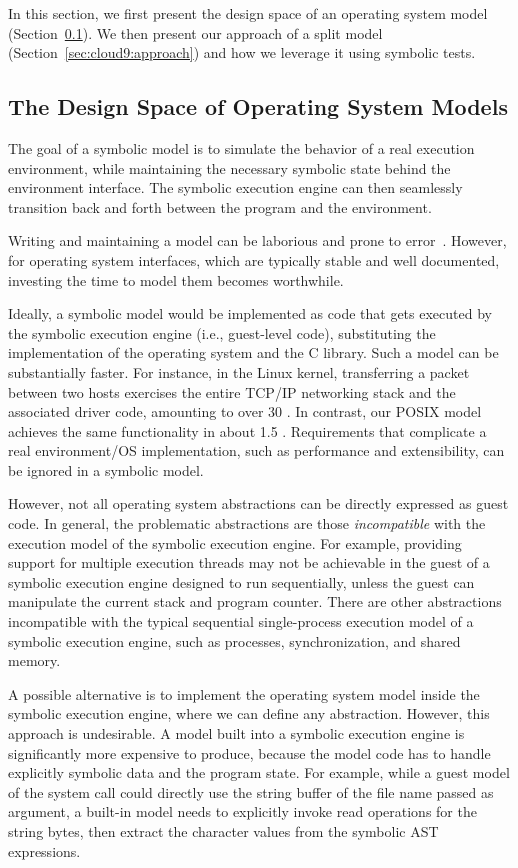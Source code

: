 In this section, we first present the design space of an operating system model (Section~\ref{sec:cloud9:modelspace}).  We then present our approach of a split model (Section~\ref{sec:cloud9:approach}) and how we leverage it using symbolic tests.


\subsection{The Design Space of Operating System Models}
\label{sec:cloud9:modelspace}

The goal of a symbolic model is to simulate the behavior of a real execution environment, while maintaining the necessary symbolic state behind the environment interface.
%
The symbolic execution engine can then seamlessly transition back and forth between the program and the environment.

Writing and maintaining a model can be laborious and prone to error~\cite{s2eSystem}.
%
However, for operating system interfaces, which are typically stable and well documented, investing the time to model them becomes worthwhile.

Ideally, a symbolic model would be implemented as code that gets executed by the symbolic execution engine (i.e., guest-level code), substituting the implementation of the operating system and the C library.
%
Such a model can be substantially faster.  For instance, in the Linux kernel, transferring a packet between two hosts exercises the entire TCP/IP networking stack and the associated driver code, amounting to over 30 \kloc.  In contrast, our POSIX model achieves the same functionality in about 1.5 \kloc.  Requirements that complicate a real environment/OS implementation, such as performance and extensibility, can be ignored in a symbolic model.

However, not all operating system abstractions can be directly expressed as guest code.
%
In general, the problematic abstractions are those \emph{incompatible} with the execution model of the symbolic execution engine.
%
For example, providing support for multiple execution threads may not be achievable in the guest of a symbolic execution engine designed to run sequentially, unless the guest can manipulate the current stack and program counter.
%
There are other abstractions incompatible with the typical sequential single-process execution model of a symbolic execution engine, such as processes, synchronization, and shared memory.

A possible alternative is to implement the operating system model inside the symbolic execution engine, where we can define any abstraction.
%
However, this approach is undesirable.  A model built into a symbolic execution engine is significantly more expensive to produce, because the model code has to handle explicitly symbolic data and the program state.
%
For example, while a guest model of the  system call could directly use the string buffer of the file name passed as argument, a built-in model needs to explicitly invoke read operations for the string bytes, then extract the character values from the symbolic AST expressions.


